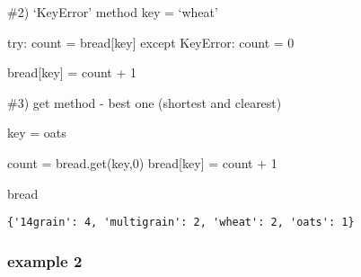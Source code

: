 \documentclass[
]{report}
\newenvironment{Shaded}{\begin{snugshade}}{\end{snugshade}}
\newcommand{\CommentTok}[1]{\textcolor[rgb]{0.37,0.37,0.37}{#1}}
\newcommand{\DecValTok}[1]{\textcolor[rgb]{0.68,0.00,0.00}{#1}}
\newcommand{\NormalTok}[1]{\textcolor[rgb]{0.00,0.23,0.31}{#1}}
\newcommand{\OperatorTok}[1]{\textcolor[rgb]{0.37,0.37,0.37}{#1}}
\newcommand{\StringTok}[1]{\textcolor[rgb]{0.13,0.47,0.30}{#1}}
\begin{document}
\#2) `KeyError' method key = `wheat'

try: count = bread{[}key{]} except KeyError: count = 0

bread{[}key{]} = count + 1

\begin{Shaded}
\begin{Highlighting}[]
\CommentTok{\#3) \textquotesingle{}get\textquotesingle{} method {-} best one (shortest and clearest)}

\NormalTok{key }\OperatorTok{=} \StringTok{\textquotesingle{}oats\textquotesingle{}}

\NormalTok{count }\OperatorTok{=}\NormalTok{ bread.get(key,}\DecValTok{0}\NormalTok{)}
\NormalTok{bread[key] }\OperatorTok{=}\NormalTok{ count }\OperatorTok{+} \DecValTok{1}
\end{Highlighting}
\end{Shaded}

\begin{Shaded}
\begin{Highlighting}[]
\NormalTok{bread}
\end{Highlighting}
\end{Shaded}

\begin{verbatim}
{'14grain': 4, 'multigrain': 2, 'wheat': 2, 'oats': 1}
\end{verbatim}

\hypertarget{example-2}{%
\subsubsection{example 2}\label{example-2}}
\end{document}
